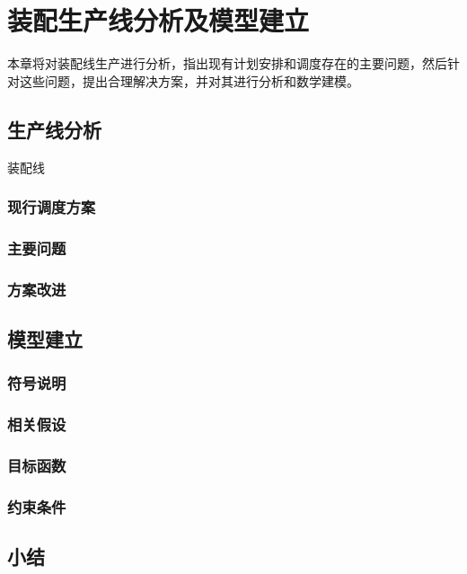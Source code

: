 \chapter{装配生产线分析及模型建立}
本章将对装配线生产进行分析，指出现有计划安排和调度存在的主要问题，然后针对这些问题，提出合理解决方案，并对其进行分析和数学建模。
\section{生产线分析}
装配线
\subsection{现行调度方案}

\subsection{主要问题}

\subsection{方案改进}

\section{模型建立}
\subsection{符号说明}

\subsection{相关假设}

\subsection{目标函数}

\subsection{约束条件}


\section{小结}